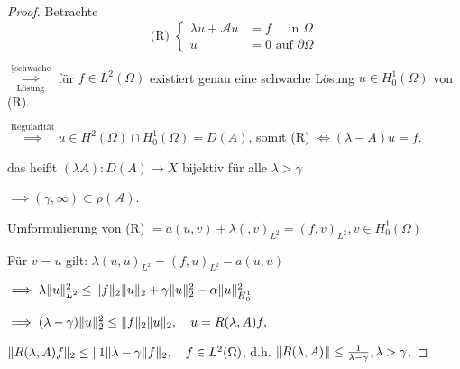 \begin{proof}
Betrachte
$$
\text{(R) } \begin{cases} \lambda u + \mathcal{A} u &= f \quad\text{ in } \Omega \\ u &= 0 \text{ auf } \partial \Omega \end{cases}
$$

$\overset{§ \text{schwache}}{\underset{\text{Lösung}}{\implies}}$  für $f \in L^2(\Omega)$ existiert genau eine schwache Lösung $u \in H_0^1(\Omega)$ von (R).

$\overset{\text{Regularität}}{\implies} u \in H^2(\Omega) \cap H_0^1(\Omega) = D(A)$, somit (R) $\iff (\lambda - A) u = f$.

das heißt $(\lambda A) \colon D(A) \to X$ bijektiv für alle $\lambda > \gamma$

$\implies (\gamma, \infty) \subset \rho(\mathcal{A})$.

Umformulierung von (R) $= a(u,v) + \lambda (,v)_{L^2} = (f, v)_{L^2}, v \in H_0^1(\Omega)$

Für $v = u$ gilt: $\lambda(u,u)_{L^2} = (f, u)_{L^2} - a(u,u)$

$\implies \lambda \lVert u \rVert_{L^2}^2 \leq \lVert f \rVert_2 \lVert u \rVert_2 + \gamma \lVert u \rVert_2^2 - \alpha \lVert u \rVert_{H_0^1}^2$

$\implies (\lambda - \gamma) \lVert u \rVert_2^2 \leq \lVert f \rVert_2 \lVert u \rVert_2, \quad u = R(\lambda, A) f,$

$\lVert R(\lambda, A) f \rVert_2 \leq \lVert 1 \rVert{\lambda - \gamma } \lVert f \rVert_2, \quad f \in L^2(\Omega)$, d.h. $\lVert R(\lambda, A) \rVert \leq \frac{1}{\lambda - \gamma}, \lambda > \gamma$.
\end{proof}


